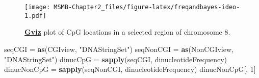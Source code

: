 \documentclass[]{article}
\newenvironment{Shaded}{\begin{snugshade}}{\end{snugshade}}
\newcommand{\KeywordTok}[1]{\textcolor[rgb]{0.13,0.29,0.53}{\textbf{#1}}}
\newcommand{\DataTypeTok}[1]{\textcolor[rgb]{0.13,0.29,0.53}{#1}}
\newcommand{\DecValTok}[1]{\textcolor[rgb]{0.00,0.00,0.81}{#1}}
\newcommand{\StringTok}[1]{\textcolor[rgb]{0.31,0.60,0.02}{#1}}
\newcommand{\OperatorTok}[1]{\textcolor[rgb]{0.81,0.36,0.00}{\textbf{#1}}}
\newcommand{\NormalTok}[1]{#1}
\begin{document}
\begin{Shaded}
\end{Shaded}

\begin{figure}
\centering
\texttt{[image: MSMB-Chapter2\_files/figure-latex/freqandbayes-ideo-1.pdf]}
\caption{\textbf{\href{https://bioconductor.org/packages/Gviz/}{Gviz}}
plot of CpG locations in a selected region of chromosome 8.}
\end{figure}

\begin{Shaded}
\end{Shaded}

\begin{Shaded}
\begin{Highlighting}[]
\NormalTok{seqCGI      =}\StringTok{ }\KeywordTok{as}\NormalTok{(CGIview, }\StringTok{"DNAStringSet"}\NormalTok{)}
\NormalTok{seqNonCGI   =}\StringTok{ }\KeywordTok{as}\NormalTok{(NonCGIview, }\StringTok{"DNAStringSet"}\NormalTok{)}
\NormalTok{dinucCpG    =}\StringTok{ }\KeywordTok{sapply}\NormalTok{(seqCGI, dinucleotideFrequency)}
\NormalTok{dinucNonCpG =}\StringTok{ }\KeywordTok{sapply}\NormalTok{(seqNonCGI, dinucleotideFrequency)}
\NormalTok{dinucNonCpG[, }\DecValTok{1}\NormalTok{]}
\end{Highlighting}
\end{Shaded}
\end{document}
